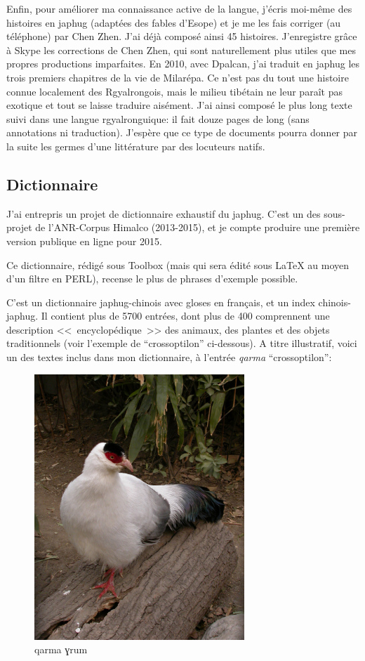 \documentclass[oldfontcommands,oneside,a4paper,11pt]{memoir}
\begin{document}
Enfin, pour améliorer ma connaissance active de la langue, j'écris moi-même des histoires en japhug (adaptées des fables d'Esope) et je me les fais corriger (au téléphone) par Chen Zhen. J'ai déjà composé ainsi 45 histoires. J'enregistre  grâce à Skype les corrections de Chen Zhen, qui sont naturellement plus utiles que mes propres productions imparfaites. En 2010, avec Dpalcan, j'ai traduit en japhug les trois premiers chapitres de la vie de Milarépa. Ce n'est pas du tout une histoire connue localement des Rgyalrongois, mais le milieu tibétain ne leur paraît pas exotique et tout se laisse traduire aisément. J'ai ainsi composé le plus long texte suivi dans une langue rgyalronguique: il fait douze pages de long (sans annotations ni traduction). J'espère que ce type de documents pourra donner par la suite les germes d'une littérature par des locuteurs natifs.

	
\subsection{Dictionnaire} \label{dico}
J'ai entrepris un projet de dictionnaire exhaustif du japhug. C'est un des sous-projet de l'ANR-Corpus Himalco (2013-2015), et je compte produire une première version publique en ligne pour 2015.

Ce dictionnaire, rédigé sous Toolbox (mais qui sera édité sous {\LaTeX} au moyen d'un filtre en PERL), recense le plus de phrases d'exemple possible. 


C'est un dictionnaire japhug-chinois avec gloses en français, et un index chinois-japhug. Il contient plus de 5700 entrées, dont plus de 400 comprennent une description <<~encyclopédique~>> des animaux, des plantes et des objets traditionnels (voir l'exemple de ``crossoptilon'' ci-dessous).   A titre illustratif, voici un des textes inclus dans mon dictionnaire, à l'entrée \textit{qarma} ``crossoptilon'':

\begin{figure}[H]
\centering
\includegraphics[height=100mm]{WhiteEaredPheasant.jpg}
\caption{qarma ɣrum}
\label{fig:rgyalrong}
\end{figure}
\end{document}
